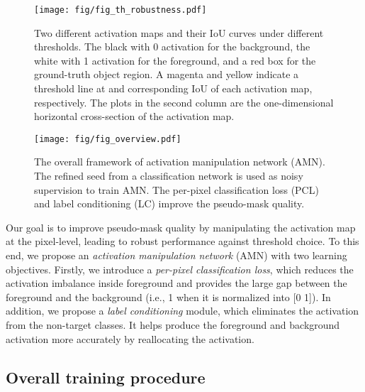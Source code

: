 \documentclass[10pt,twocolumn,letterpaper]{article}
\begin{document}
\begin{figure}[t]
\centering
\texttt{[image: fig/fig\_th\_robustness.pdf]}
\vspace{-2mm}
\caption{Two different activation maps and their IoU curves under different thresholds. The black with 0 activation for the background, the white with 1 activation for the foreground, and a red box for the ground-truth object region. A magenta and yellow indicate a threshold line at  and corresponding IoU of each activation map, respectively. The plots in the second column are the one-dimensional horizontal cross-section of the activation map.}



\label{fig:th_robust}
\vspace{-5mm}
\end{figure} \begin{figure*}
\begin{center}
\texttt{[image: fig/fig\_overview.pdf]}
\end{center}
\vspace{-3mm}
\caption{The overall framework of activation manipulation network (AMN). The refined seed from a classification network is used as noisy supervision to train AMN. The per-pixel classification loss (PCL) and label conditioning (LC) improve the pseudo-mask quality.}
\label{fig:overview}
\vspace{-4mm}
\end{figure*} Our goal is to improve pseudo-mask quality by manipulating the activation map at the pixel-level, leading to robust performance against threshold choice. To this end, we propose an \textit{activation manipulation network} (AMN) with two learning objectives. Firstly, we introduce a \textit{per-pixel classification loss}, which reduces the activation imbalance inside foreground and provides the large gap between the foreground and the background (i.e., 1 when it is normalized into [0 1]). In addition, we propose a \textit{label conditioning} module, which eliminates the activation from the non-target classes. It helps produce the foreground and background activation more accurately by reallocating the activation.


\subsection{Overall training procedure}\label{subsection:4.1}
\end{document}
